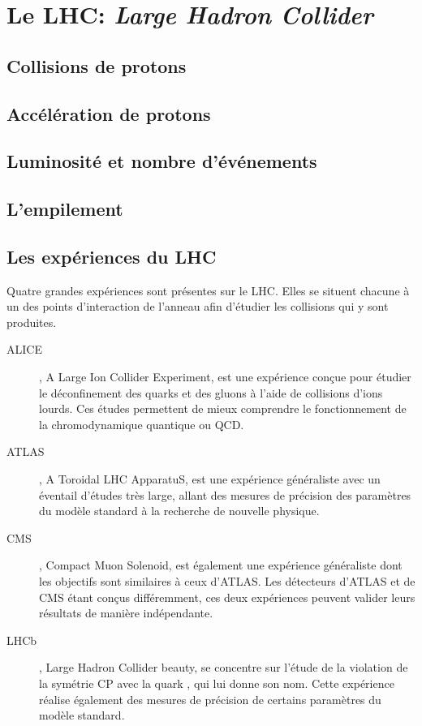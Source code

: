 \section{Le LHC: \emph{Large Hadron Collider}}\label{chapter-LHC-section-LHC}

\subsection{Collisions de protons}\label{chapter-LHC-section-LHC-subsec-pp_collisions}

\subsection{Accélération de protons}\label{chapter-LHC-section-LHC-subsec-pp_acceleration}

\subsection{Luminosité et nombre d'événements}\label{chapter-LHC-section-LHC-subsec-lumi}

\subsection{L'empilement}\label{chapter-LHC-section-LHC-subsec-PU}

\subsection{Les expériences du LHC}\label{chapter-LHC-section-LHC-subsec-experiments}
Quatre grandes expériences sont présentes sur le LHC. Elles se situent chacune à un des points d'interaction de l'anneau afin d'étudier les collisions qui y sont produites.
\begin{description}
\item[ALICE]\cite{alice_paper}, A Large Ion Collider Experiment, est une expérience conçue pour étudier le déconfinement des quarks et des gluons à l'aide de collisions d'ions lourds. Ces études permettent de mieux comprendre le fonctionnement de la chromodynamique quantique ou QCD.
\item[ATLAS]\cite{atlas_paper}, A Toroidal LHC ApparatuS, est une expérience généraliste avec un éventail d'études très large, allant des mesures de précision des paramètres du modèle standard à la recherche de nouvelle physique.
\item[CMS]\cite{cms_paper}, Compact Muon Solenoid, est également une expérience généraliste dont les objectifs sont similaires à ceux d'ATLAS. Les détecteurs d'ATLAS et de CMS étant conçus différemment, ces deux expériences peuvent valider leurs résultats de manière indépendante.
\item[LHCb]\cite{lhcb_paper}, Large Hadron Collider beauty, se concentre sur l'étude de la violation de la symétrie CP avec la quark \quarkb, qui lui donne son nom. Cette expérience réalise également des mesures de précision de certains paramètres du modèle standard.
\end{description}
